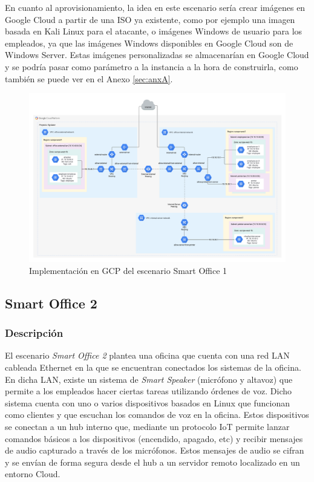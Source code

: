   En cuanto al aprovisionamiento, la idea en este escenario sería crear imágenes en Google Cloud a partir de una ISO ya existente, como por ejemplo una imagen basada en Kali Linux para el atacante, o imágenes Windows de usuario para los empleados, ya que las imágenes Windows disponibles en Google Cloud son de Windows Server. Estas imágenes personalizadas se almacenarían en Google Cloud y se podría pasar como parámetro a la instancia a la hora de construirla, como también se puede ver en el Anexo \ref{sec:anxA}.

  \clearpage
  \begin{figure}[h]
  \centering
  \includegraphics[width=1.45\textwidth, angle=270]{../imgs/desarrollo/escenarios-de-red/smart-office-1/EscenarioSmartOffice1V2.png}
  \caption{Implementación en GCP del escenario Smart Office 1}
  \label{fig:so1-i}
  \end{figure}
  \clearpage 

\subsection{Smart Office 2} \label{sec:so2}
\subsubsection{Descripción}
  El escenario \textit{Smart Office 2} plantea una oficina que cuenta con una red LAN cableada Ethernet en la que se encuentran conectados los sistemas de la oficina. En dicha LAN, existe un sistema de \textit{Smart Speaker} (micrófono y altavoz) que permite a los empleados hacer ciertas tareas utilizando órdenes de voz. Dicho sistema cuenta con uno o varios dispositivos basados en Linux que funcionan como clientes y que escuchan los comandos de voz en la oficina. Estos dispositivos se conectan a un hub interno que, mediante un protocolo IoT permite lanzar comandos básicos a los dispositivos (encendido, apagado, etc) y recibir mensajes de audio capturado a través de los micrófonos. Estos mensajes de audio se cifran y se envían de forma segura desde el hub a un servidor remoto localizado en un entorno Cloud.

